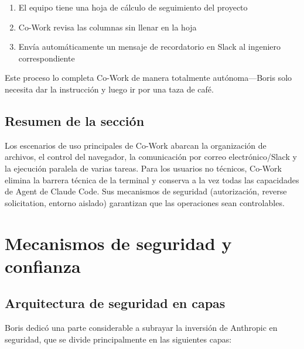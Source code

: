 \documentclass[a4paper]{article}
\begin{document}
\begin{enumerate}
    \item El equipo tiene una hoja de cálculo de seguimiento del proyecto
    \item Co-Work revisa las columnas sin llenar en la hoja
    \item Envía automáticamente un mensaje de recordatorio en Slack al ingeniero correspondiente
\end{enumerate}

Este proceso lo completa Co-Work de manera totalmente autónoma—Boris solo necesita dar la instrucción y luego ir por una taza de café.

\subsection{Resumen de la sección}

Los escenarios de uso principales de Co-Work abarcan la organización de archivos, el control del navegador, la comunicación por correo electrónico/Slack y la ejecución paralela de varias tareas. Para los usuarios no técnicos, Co-Work elimina la barrera técnica de la terminal y conserva a la vez todas las capacidades de Agent de Claude Code. Sus mecanismos de seguridad (autorización, reverse solicitation, entorno aislado) garantizan que las operaciones sean controlables.

\section{Mecanismos de seguridad y confianza}

\subsection{Arquitectura de seguridad en capas}

Boris dedicó una parte considerable a subrayar la inversión de Anthropic en seguridad, que se divide principalmente en las siguientes capas:
\end{document}
